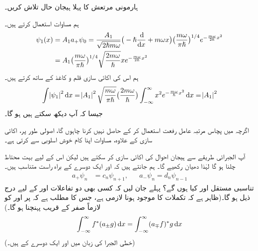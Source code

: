 ہارمونی مرتعش کا پہلا ہیجان حال تلاش کریں۔ 

 ہم مساوات  استعمال کرتے ہیں۔ 
\begin{gather}
\begin{aligned}\label{مساوات_شروڈنگر_ہارمونی_ہیجان_حالات}
\psi_1 (x) &= A_1 a_+ \psi_0 = \frac{ A_1}{ \sqrt{ 2 \hslash m \omega}} \big( -\hslash \frac{\dif}{\dif x} + m \omega x\big) \big( \frac{ m \omega}{ \pi \hslash} \big)^{1/4} e^{-\frac{ m \omega}{ 2 \hslash} x^2}\\
 &= A_1 \big( \frac{ m \omega}{ \pi \hslash}\big)^{1/4} \sqrt{ \frac{ 2 m \omega}{ \hslash}} x e^{-\frac{ m \omega}{ 2 \hslash} x^2}
\end{aligned}
\end{gather}
ہم اس کی اکائی سازی قلم و کاغذ کے ساتھ کرتے ہیں۔ 
\begin{align*}
\int \abs{\psi_1}^2 \dif x = \abs{A_1}^2 \sqrt{ \frac{ m \omega}{ \pi \hslash}} \big( \frac{ 2 m \omega}{ \hslash} \big ) \int_{ - \infty}^{ \infty} x^2 e^{-\frac{ m \omega}{ \hslash} x^2} \dif x = \abs{A_1}^2
\end{align*} 
جیسا  کہ آپ دیکھ سکتے ہیں  ہو گا۔
 
اگرچہ میں پچاس مرتبہ عامل رفعت استعمال کر کے  حاصل نہیں کرنا چاہوں گا، اصولی طور پر، اکائی سازی کے علاوہ، مساوات  اپنا کام خوش اسلوبی سے کرتی ہے۔

 آپ الجبرائی طریقے سے ہیجان احوال کی اکائی سازی کر سکتے ہیں لیکن اس کے لیے بہت محتاط چلنا ہو گا لہٰذا دھیان رکھیے گا۔ ہم جانتے ہیں کہ 
 اور  ایک دوسرے کے براہ  راست متناسب ہیں۔ 
\begin{align} 
a_+ \psi_n&= c_n \psi_{n+1} , && a_- \psi_n = d_n \psi_{n-1}
\end{align} 
 تناسبی مستقل  اور  کیا ہوں گے؟ پہلے جان لیں کہ کسی بھی  دو تفاعلات  اور  کے لیے درج ذیل ہو گا۔(ظاہر ہے کہ تکملات کا موجود ہونا لازمی ہے، جس کا مطلب ہے کہ  پر  اور  کو لازماً صفر   کے قریب   پہنچنا ہو گا۔)
\begin{align}\label{مساوات_شروڈنگر_سیڑھی_متبادل}
\int_{ - \infty}^{ \infty} f^*( a_{\pm} g ) \dif x = \int_{ - \infty}^{ \infty} ( a_{\mp} f)^* g \dif x
\end{align}
(خطی الجبرا کی زبان میں  اور  ایک دوسرے کے  ہیں۔)

